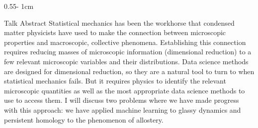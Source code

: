 \documentclass{../psuposter}
\begin{document}
\begin{frame}
\begin{columns}[t, totalwidth=\textwidth]
\begin{column}{0.55\textwidth - 1cm}
    \begin{block}{Talk Abstract}
    	Statistical mechanics has been the workhorse that condensed matter physicists have used to make the connection between microscopic properties and macroscopic, collective phenomena. Establishing this connection requires reducing masses of microscopic information (dimensional reduction) to a few relevant microscopic variables and their distributions. Data science methods are designed for dimensional reduction, so they are a natural tool to turn to when statistical mechanics fails. But it requires physics to identify the relevant microscopic quantities as well as the most appropriate data science methods to use to access them. I will discuss two problems where we have made progress with this approach: we have applied machine learning to glassy dynamics and persistent homology to the phenomenon of allostery. 
    \end{block}



\end{column}
\end{columns}
\end{frame}
\end{document}
